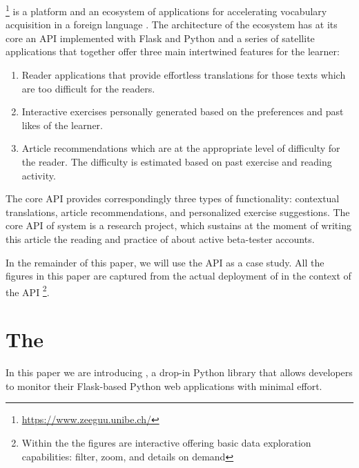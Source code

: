 \documentclass[conference]{IEEEtran}
\begin{document}
  \zee\footnote{\url{https://www.zeeguu.unibe.ch/}} is a platform and an ecosystem of applications for accelerating vocabulary acquisition in a foreign language \cite{Lungu16}. 
%
  The architecture of the ecosystem has at its core an API implemented with Flask and Python and a series of satellite applications that together offer three main intertwined features for the learner:

  \begin{enumerate}

    \item Reader applications that provide effortless translations for those texts which are too difficult for the readers.

    \item Interactive exercises personally generated based on the preferences and past likes of the learner.

    \item Article recommendations which are at the appropriate level of difficulty for the reader. The difficulty is estimated based on past exercise and reading activity.

  \end{enumerate}

  The core API provides correspondingly three types of functionality: contextual translations, article recommendations, and personalized exercise suggestions. The core API of system is a research project, which sustains at the moment of writing this article the reading and practice of about \activeUserCount active beta-tester accounts. 

  In the remainder of this paper, we will use the \zee API as a case study. All the figures in this paper are captured from the actual deployment of \tool in the context of the \zee API \footnote{Within the \tool the figures are interactive offering basic data exploration capabilities: filter, zoom, and details on demand\cite{Shne99a}}.





\section{The \tool}
  In this paper we are introducing \tool, a drop-in Python library that allows developers to monitor their Flask-based Python web applications with minimal effort.
\end{document}
